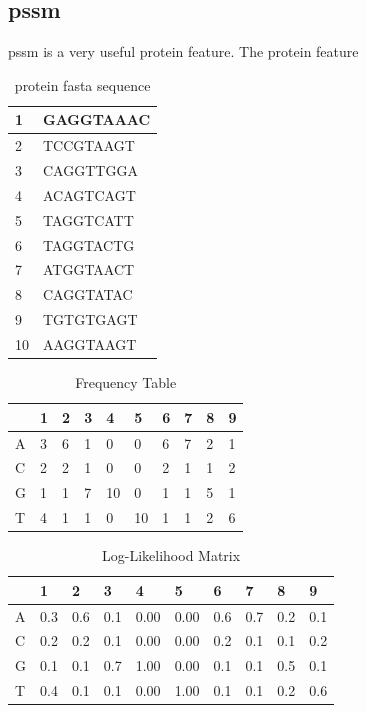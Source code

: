 \subsection{\acrfull{pssm}}

\acrfull{pssm} is a very useful protein feature. The protein feature
\begin{table}[h]
    \centering
    \caption{protein fasta sequence}
    \begin{tabular}{|l|l|}
    \hline
    
    1 & GAGGTAAAC \\ \hline
    2 & TCCGTAAGT \\ \hline
    3 & CAGGTTGGA \\ \hline
    4 & ACAGTCAGT \\ \hline
    5 & TAGGTCATT \\ \hline
    6 & TAGGTACTG \\ \hline
    7 & ATGGTAACT \\ \hline
    8 & CAGGTATAC \\ \hline
    9 & TGTGTGAGT \\ \hline
    10 & AAGGTAAGT \\ \hline
    
    \end{tabular}
\end{table}

\begin{table}[h]
    \centering
    \caption{Frequency Table}
    \begin{tabular}{|l|l|l|l|l|l|l|l|l|l|}
    \hline
    
     & 1 & 2 & 3 & 4 & 5 & 6 & 7 & 8 & 9 \\ \hline
    A & 3 & 6 & 1 & 0 & 0 & 6 & 7 & 2 & 1 \\ \hline
    C & 2 & 2 & 1 & 0 & 0 & 2 & 1 & 1 & 2 \\ \hline
    G & 1 & 1 & 7 & 10 & 0 & 1 & 1 & 5 & 1 \\ \hline
    T & 4 & 1 & 1 & 0 & 10 & 1 & 1 & 2 & 6 \\ \hline
    
    \end{tabular}
\end{table}

\begin{table}[h]
    \centering
    \caption{Log-Likelihood Matrix}
    \begin{tabular}{|l|l|l|l|l|l|l|l|l|l|}
    \hline
    
        & 1 & 2 & 3 & 4 & 5 & 6 & 7 & 8 & 9 \\ \hline
    A & 0.3 & 0.6 & 0.1 & 0.00 & 0.00 & 0.6 & 0.7 & 0.2 & 0.1 \\ \hline
    C & 0.2 & 0.2 & 0.1 & 0.00 & 0.00 & 0.2 & 0.1 & 0.1 & 0.2 \\ \hline
    G & 0.1 & 0.1 & 0.7 & 1.00 & 0.00 & 0.1 & 0.1 & 0.5 & 0.1 \\ \hline
    T & 0.4 & 0.1 & 0.1 & 0.00 & 1.00 & 0.1 & 0.1 & 0.2 & 0.6 \\ \hline
    
    \end{tabular}
\end{table}

